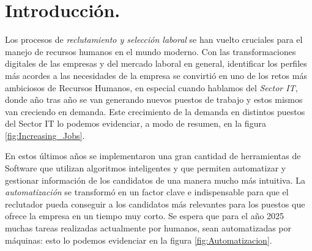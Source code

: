 \documentclass[12pt,a4paper]{article}
\begin{document}
\begin{sloppypar}
\cleardoublepage    %

\tableofcontents 	%

\cleardoublepage    %

\section{Introducción.}\label{Intro}
Los procesos de \textit{reclutamiento y selección laboral} se han vuelto cruciales para el manejo de recursos humanos en el mundo moderno. Con las transformaciones digitales de las empresas y del mercado laboral en general, identificar los perfiles más acordes a las necesidades de la empresa se convirtió en uno de los retos más ambiciosos de Recursos Humanos, en especial cuando hablamos del \textit{Sector IT}, donde año tras año se van generando nuevos puestos de trabajo y estos mismos van creciendo en demanda. Este crecimiento de la demanda en distintos puestos del Sector IT lo podemos evidenciar, a modo de resumen, en la figura \ref{fig:Increasing_Jobs}.

En estos últimos años se implementaron una gran cantidad de herramientas de Software que utilizan algoritmos inteligentes y que permiten automatizar y gestionar información de los candidatos de una manera mucho más intuitiva\cite{trabajos_relacionados_1,trabajos_relacionados_2,trabajos_relacionados_3,trabajos_relacionados_4,
trabajos_relacionados_5,trabajos_relacionados_6,trabajos_relacionados_7,trabajos_relacionados_8,
trabajos_relacionados_9,trabajos_relacionados_10, trabajos_relacionados_11, trabajos_relacionados_12, trabajos_relacionados_13, trabajos_relacionados_14, trabajos_relacionados_15}. La \textit{automatización} se transformó en un factor clave e indispensable para que el reclutador pueda conseguir a los candidatos más relevantes para los puestos que ofrece la empresa en un tiempo muy corto.
Se espera que para el año 2025 muchas tareas realizadas actualmente por humanos, sean automatizadas por máquinas: esto lo podemos evidenciar en la figura \ref{fig:Automatizacion}.


\end{sloppypar}
\end{document}
